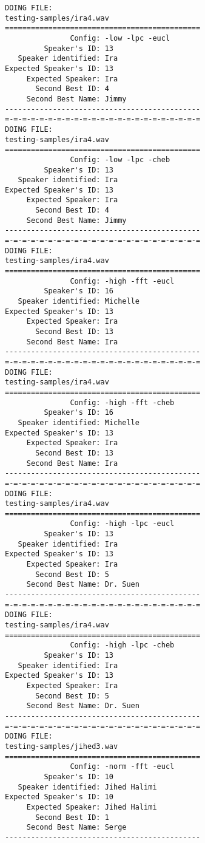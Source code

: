 \begin{verbatim}
DOING FILE:
testing-samples/ira4.wav
=============================================
               Config: -low -lpc -eucl
         Speaker's ID: 13
   Speaker identified: Ira
Expected Speaker's ID: 13
     Expected Speaker: Ira
       Second Best ID: 4
     Second Best Name: Jimmy
---------------------------------------------
=-=-=-=-=-=-=-=-=-=-=-=-=-=-=-=-=-=-=-=-=-=-=
DOING FILE:
testing-samples/ira4.wav
=============================================
               Config: -low -lpc -cheb
         Speaker's ID: 13
   Speaker identified: Ira
Expected Speaker's ID: 13
     Expected Speaker: Ira
       Second Best ID: 4
     Second Best Name: Jimmy
---------------------------------------------
=-=-=-=-=-=-=-=-=-=-=-=-=-=-=-=-=-=-=-=-=-=-=
DOING FILE:
testing-samples/ira4.wav
=============================================
               Config: -high -fft -eucl
         Speaker's ID: 16
   Speaker identified: Michelle
Expected Speaker's ID: 13
     Expected Speaker: Ira
       Second Best ID: 13
     Second Best Name: Ira
---------------------------------------------
=-=-=-=-=-=-=-=-=-=-=-=-=-=-=-=-=-=-=-=-=-=-=
DOING FILE:
testing-samples/ira4.wav
=============================================
               Config: -high -fft -cheb
         Speaker's ID: 16
   Speaker identified: Michelle
Expected Speaker's ID: 13
     Expected Speaker: Ira
       Second Best ID: 13
     Second Best Name: Ira
---------------------------------------------
=-=-=-=-=-=-=-=-=-=-=-=-=-=-=-=-=-=-=-=-=-=-=
DOING FILE:
testing-samples/ira4.wav
=============================================
               Config: -high -lpc -eucl
         Speaker's ID: 13
   Speaker identified: Ira
Expected Speaker's ID: 13
     Expected Speaker: Ira
       Second Best ID: 5
     Second Best Name: Dr. Suen
---------------------------------------------
=-=-=-=-=-=-=-=-=-=-=-=-=-=-=-=-=-=-=-=-=-=-=
DOING FILE:
testing-samples/ira4.wav
=============================================
               Config: -high -lpc -cheb
         Speaker's ID: 13
   Speaker identified: Ira
Expected Speaker's ID: 13
     Expected Speaker: Ira
       Second Best ID: 5
     Second Best Name: Dr. Suen
---------------------------------------------
=-=-=-=-=-=-=-=-=-=-=-=-=-=-=-=-=-=-=-=-=-=-=
DOING FILE:
testing-samples/jihed3.wav
=============================================
               Config: -norm -fft -eucl
         Speaker's ID: 10
   Speaker identified: Jihed Halimi
Expected Speaker's ID: 10
     Expected Speaker: Jihed Halimi
       Second Best ID: 1
     Second Best Name: Serge
---------------------------------------------

\end{verbatim}
